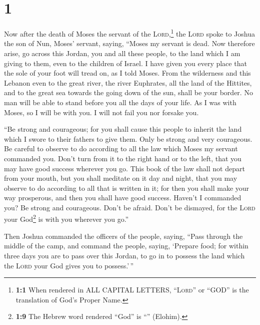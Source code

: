 \hypertarget{section}{%
\section{1}\label{section}}

 Now after the death of Moses the servant of the
\textsc{Lord},\footnote{\textbf{1:1} When rendered in ALL CAPITAL
  LETTERS, ``\textsc{Lord}'' or ``GOD'' is the translation of God's
  Proper Name.} the \textsc{Lord} spoke to Joshua the son of Nun, Moses'
servant, saying,  ``Moses my servant is dead. Now
therefore arise, go across this Jordan, you and all these people, to the
land which I am giving to them, even to the children of Israel.
 I have given you every place that the sole of your foot
will tread on, as I told Moses.  From the wilderness and
this Lebanon even to the great river, the river Euphrates, all the land
of the Hittites, and to the great sea towards the going down of the sun,
shall be your border.  No man will be able to stand before
you all the days of your life. As I was with Moses, so I will be with
you. I will not fail you nor forsake you.

 ``Be strong and courageous; for you shall cause this
people to inherit the land which I swore to their fathers to give them.
 Only be strong and very courageous. Be careful to observe
to do according to all the law which Moses my servant commanded you.
Don't turn from it to the right hand or to the left, that you may have
good success wherever you go.  This book of the law shall
not depart from your mouth, but you shall meditate on it day and night,
that you may observe to do according to all that is written in it; for
then you shall make your way prosperous, and then you shall have good
success.  Haven't I commanded you? Be strong and
courageous. Don't be afraid. Don't be dismayed, for the \textsc{Lord}
your God\footnote{\textbf{1:9} The Hebrew word rendered ``God'' is
  ``'' (Elohim).} is with you wherever you go.''

 Then Joshua commanded the officers of the people,
saying,  ``Pass through the middle of the camp, and
command the people, saying, `Prepare food; for within three days you are
to pass over this Jordan, to go in to possess the land which the
\textsc{Lord} your God gives you to possess.'\,''

